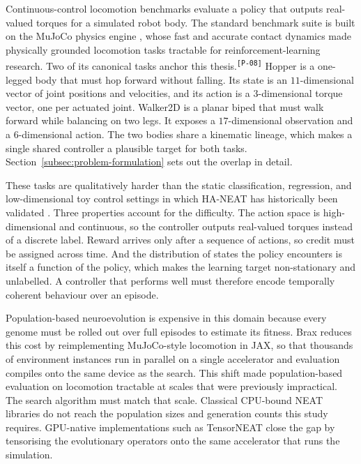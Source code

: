 \documentclass[12pt]{article}
\newcommand{\revID}[1]{\textsuperscript{\scriptsize\texttt{[#1]}}}
\newcommand{\revPlain}[2]{\textcolor{lrGreen}{#2}\revID{#1}}    %
\begin{document}

Continuous-control locomotion benchmarks evaluate a policy that outputs real-valued torques for a simulated robot body.
The standard benchmark suite \parencite{brockman_openai_2016,duan_benchmarking_2016} is built on the MuJoCo physics engine \parencite{todorov_mujoco_2012}, whose fast and accurate contact dynamics made physically grounded locomotion tasks tractable for reinforcement-learning research.
\revPlain{P-08}{Two of its canonical tasks anchor this thesis.}
Hopper is a one-legged body that must hop forward without falling. Its state is an $11$-dimensional vector of joint positions and velocities, and its action is a $3$-dimensional torque vector, one per actuated joint.
Walker2D is a planar biped that must walk forward while balancing on two legs. It exposes a $17$-dimensional observation and a $6$-dimensional action.
The two bodies share a kinematic lineage, which makes a single shared controller a plausible target for both tasks. Section~\ref{subsec:problem-formulation} sets out the overlap in detail.

These tasks are qualitatively harder than the static classification, regression, and low-dimensional toy control settings in which HA-NEAT has historically been validated \parencite{hagg_evolving_2017}.
Three properties account for the difficulty.
The action space is high-dimensional and continuous, so the controller outputs real-valued torques instead of a discrete label.
Reward arrives only after a sequence of actions, so credit must be assigned across time.
And the distribution of states the policy encounters is itself a function of the policy, which makes the learning target non-stationary and unlabelled.
A controller that performs well must therefore encode temporally coherent behaviour over an episode.

Population-based neuroevolution is expensive in this domain because every genome must be rolled out over full episodes to estimate its fitness.
Brax \parencite{freeman_brax_2021} reduces this cost by reimplementing MuJoCo-style locomotion in JAX, so that thousands of environment instances run in parallel on a single accelerator and evaluation compiles onto the same device as the search.
This shift made population-based evaluation on locomotion tractable at scales that were previously impractical.
The search algorithm must match that scale.
Classical CPU-bound NEAT libraries do not reach the population sizes and generation counts this study requires.
GPU-native implementations such as TensorNEAT \parencite{wang_tensorized_2024} close the gap by tensorising the evolutionary operators onto the same accelerator that runs the simulation.
\end{document}
